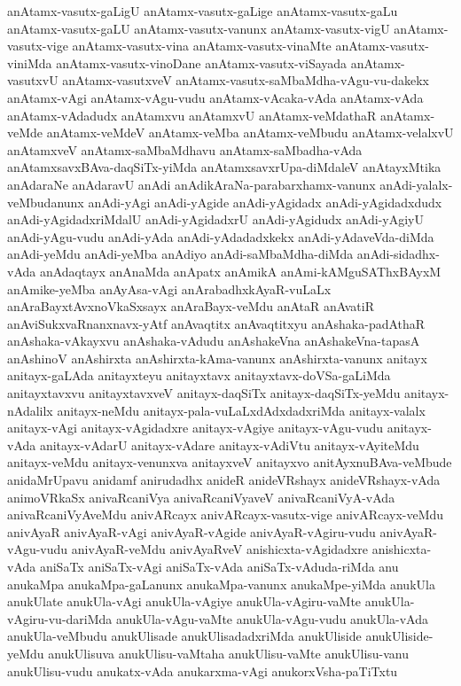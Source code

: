 {anAtamx-vasutx-gaLigU
anAtamx-vasutx-gaLige
anAtamx-vasutx-gaLu
anAtamx-vasutx-gaLU
anAtamx-vasutx-vanunx
anAtamx-vasutx-vigU
anAtamx-vasutx-vige
anAtamx-vasutx-vina
anAtamx-vasutx-vinaMte
anAtamx-vasutx-viniMda
anAtamx-vasutx-vinoDane
anAtamx-vasutx-viSayada
anAtamx-vasutxvU
anAtamx-vasutxveV
anAtamx-vasutx-saMbaMdha-vAgu-vu-dakekx
anAtamx-vAgi
anAtamx-vAgu-vudu
anAtamx-vAcaka-vAda
anAtamx-vAda
anAtamx-vAdadudx
anAtamxvu
anAtamxvU
anAtamx-veMdathaR
anAtamx-veMde
anAtamx-veMdeV
anAtamx-veMba
anAtamx-veMbudu
anAtamx-velalxvU
anAtamxveV
anAtamx-saMbaMdhavu
anAtamx-saMbadha-vAda
anAtamxsavxBAva-daqSiTx-yiMda
anAtamxsavxrUpa-diMdaleV
anAtayxMtika
anAdaraNe
anAdaravU
anAdi
anAdikAraNa-parabarxhamx-vanunx
anAdi-yalalx-veMbudanunx
anAdi-yAgi
anAdi-yAgide
anAdi-yAgidadx
anAdi-yAgidadxdudx
anAdi-yAgidadxriMdalU
anAdi-yAgidadxrU
anAdi-yAgidudx
anAdi-yAgiyU
anAdi-yAgu-vudu
anAdi-yAda
anAdi-yAdadadxkekx
anAdi-yAdaveVda-diMda
anAdi-yeMdu
anAdi-yeMba
anAdiyo
anAdi-saMbaMdha-diMda
anAdi-sidadhx-vAda
anAdaqtayx
anAnaMda
anApatx
anAmikA
anAmi-kAMguSAThxBAyxM
anAmike-yeMba
anAyAsa-vAgi
anArabadhxkAyaR-vuLaLx
anAraBayxtAvxnoVkaSxsayx
anAraBayx-veMdu
anAtaR
anAvatiR
anAviSukxvaRnanxnavx-yAtf
anAvaqtitx
anAvaqtitxyu
anAshaka-padAthaR
anAshaka-vAkayxvu
anAshaka-vAdudu
anAshakeVna
anAshakeVna-tapasA
anAshinoV
anAshirxta
anAshirxta-kAma-vanunx
anAshirxta-vanunx
anitayx
anitayx-gaLAda
anitayxteyu
anitayxtavx
anitayxtavx-doVSa-gaLiMda
anitayxtavxvu
anitayxtavxveV
anitayx-daqSiTx
anitayx-daqSiTx-yeMdu
anitayx-nAdalilx
anitayx-neMdu
anitayx-pala-vuLaLxdAdxdadxriMda
anitayx-valalx
anitayx-vAgi
anitayx-vAgidadxre
anitayx-vAgiye
anitayx-vAgu-vudu
anitayx-vAda
anitayx-vAdarU
anitayx-vAdare
anitayx-vAdiVtu
anitayx-vAyiteMdu
anitayx-veMdu
anitayx-venunxva
anitayxveV
anitayxvo
anitAyxnuBAva-veMbude
anidaMrUpavu
anidamf
anirudadhx
anideR
anideVRshayx
anideVRshayx-vAda
animoVRkaSx
anivaRcaniVya
anivaRcaniVyaveV
anivaRcaniVyA-vAda
anivaRcaniVyAveMdu
anivARcayx
anivARcayx-vasutx-vige
anivARcayx-veMdu
anivAyaR
anivAyaR-vAgi
anivAyaR-vAgide
anivAyaR-vAgiru-vudu
anivAyaR-vAgu-vudu
anivAyaR-veMdu
anivAyaRveV
anishicxta-vAgidadxre
anishicxta-vAda
aniSaTx
aniSaTx-vAgi
aniSaTx-vAda
aniSaTx-vAduda-riMda
anu
anukaMpa
anukaMpa-gaLanunx
anukaMpa-vanunx
anukaMpe-yiMda
anukUla
anukUlate
anukUla-vAgi
anukUla-vAgiye
anukUla-vAgiru-vaMte
anukUla-vAgiru-vu-dariMda
anukUla-vAgu-vaMte
anukUla-vAgu-vudu
anukUla-vAda
anukUla-veMbudu
anukUlisade
anukUlisadadxriMda
anukUliside
anukUliside-yeMdu
anukUlisuva
anukUlisu-vaMtaha
anukUlisu-vaMte
anukUlisu-vanu
anukUlisu-vudu
anukatx-vAda
anukarxma-vAgi
anukorxVsha-paTiTxtu
}
